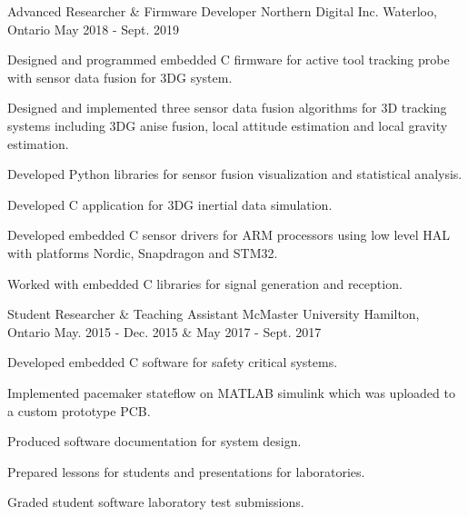 
\begin{cventries}

  \cventry
    {Advanced Researcher \& Firmware Developer} %
    {Northern Digital Inc.} %
    {Waterloo, Ontario} %
    {May 2018 - Sept. 2019} %
    {
      \begin{cvitems} %
        \item {Designed and programmed embedded C firmware for active tool tracking probe with sensor data fusion for 3DG system.}
        \item {Designed and implemented three sensor data fusion algorithms for 3D tracking systems including 3DG anise fusion, local attitude estimation and local gravity estimation.}
        \item {Developed Python libraries for sensor fusion visualization and statistical analysis.}
        \item {Developed C application for 3DG inertial data simulation.}
        \item {Developed embedded C sensor drivers for ARM processors using low level HAL with platforms Nordic, Snapdragon and STM32.}
        \item {Worked with embedded C libraries for signal generation and reception.}
      \end{cvitems}
    }

  \cventry
    {Student Researcher \& Teaching Assistant} %
    {McMaster University} %
    {Hamilton, Ontario} %
    {May. 2015 - Dec. 2015 \& May 2017 - Sept. 2017} %
    {
      \begin{cvitems} %
        \item {Developed embedded C software for safety critical systems.}
        \item {Implemented pacemaker stateflow on MATLAB simulink which was uploaded to a custom prototype PCB.}
        \item {Produced software documentation for system design.}
        \item {Prepared lessons for students and presentations for laboratories.}
        \item {Graded student software laboratory test submissions.}
      \end{cvitems}
    }


\end{cventries}
